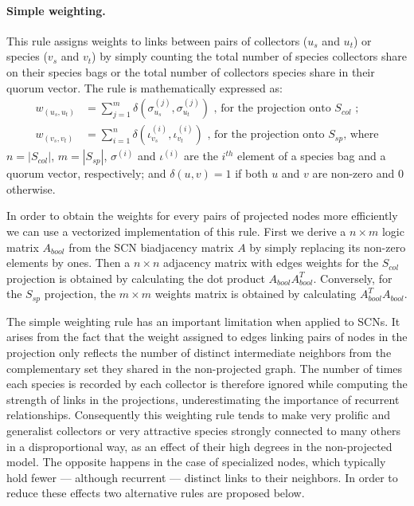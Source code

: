 \paragraph*{Simple weighting.}
This rule assigns weights to links between pairs of collectors ($u_s$ and $u_t$) or species ($v_s$ and $v_t$) by simply counting the total number of species collectors share on their species bags or the total number of collectors species share in their quorum vector. The rule is mathematically expressed as:
\begin{equation} \label{eq:simple_weighting}
\begin{split}
w_{(u_s, u_t)} &= \sum_{j=1}^{m} \delta(\sigma^{(j)}_{u_s}, \sigma^{(j)}_{u_t})\mbox{ , for the projection onto }S_{col}\mbox{ ;}\\
w_{(v_s, v_t)} &= \sum_{i=1}^{n} \delta(\iota^{(i)}_{v_s}, \iota^{(i)}_{v_t})
\mbox{ , for the projection onto }S_{sp}\mbox{, where}
\end{split}
\end{equation}
$n = |S_{col}|$, $m = |S_{sp}|$, $\sigma^{(i)}$ and $\iota^{(i)}$ are the $i^{th}$ element of a species bag and a quorum vector, respectively; and $\delta(u,v)=1$ if both $u$ and $v$ are non-zero and $0$ otherwise.

In order to obtain the weights for every pairs of projected nodes more efficiently we can use a vectorized implementation of this rule. First we derive a $n\times m$ logic matrix $A_{bool}$ from the SCN biadjacency matrix $A$ by simply replacing its non-zero elements by ones. 
Then a $n \times n$ adjacency matrix with edges weights for the $S_{col}$ projection is obtained by calculating the dot product $A_{bool} A_{bool}^T$.
Conversely, for the $S_{sp}$ projection, the $m \times m$ weights matrix is obtained by calculating $A_{bool}^T A_{bool}$.

The simple weighting rule has an important limitation when applied to SCNs.
It arises from the fact that the weight assigned to edges linking pairs of nodes in the projection only reflects the number of distinct intermediate neighbors from the complementary set they shared in the non-projected graph. The number of times each species is recorded by each collector is therefore ignored while computing the strength of links in the projections, underestimating the importance of recurrent relationships.
Consequently this weighting rule tends to make very prolific and generalist collectors or very attractive species strongly connected to many others in a disproportional way, as an effect of their high degrees in the non-projected model. The opposite happens in the case of specialized nodes, which typically hold fewer --- although recurrent --- distinct links to their neighbors. 
In order to reduce these effects two alternative rules are proposed below.

